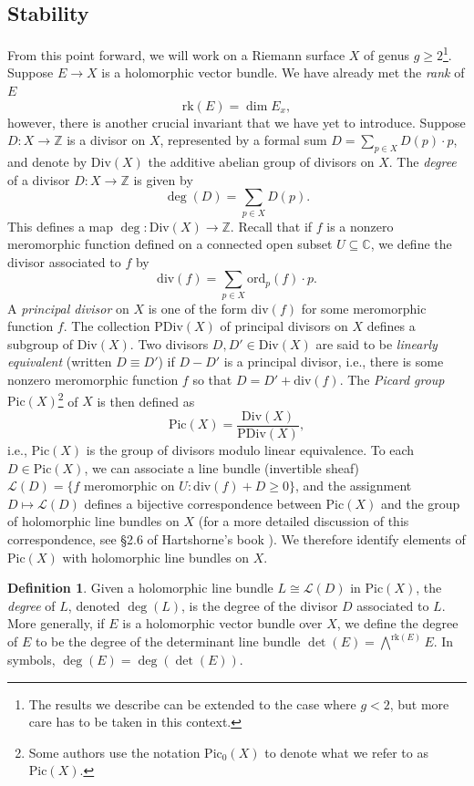 \documentclass[10pt]{amsart}
\numberwithin{equation}{section}
\def\~#1{\mathscr{#1}}
\newcommand{\C}{\mathbb{C}}
\newcommand{\Z}{\mathbb{Z}}
\newcommand{\ord}{\mathrm{ord}}
\newcommand{\rk}{\mathrm{rk}}
\renewcommand{\div}{\mathrm{div}}
\newcommand{\Div}{\mathrm{Div}}
\newcommand{\PDiv}{\mathrm{PDiv}}
\newcommand{\Pic}{\mathrm{Pic}}
\theoremstyle{plain}
\theoremstyle{definition}
\newtheorem{defn}[thm]{Definition}
\theoremstyle{remark}
\begin{document}
\subsection{Stability}
From this point forward, we will work on a Riemann surface $X$ of genus $g \ge 2$\footnote{The results we describe can be extended to the case where $g < 2$, but more care has to be taken in this context.}. Suppose $E \to X$ is a holomorphic vector bundle. We have already met the \emph{rank} of $E$ 
\[\rk(E) = \dim E_x,\]
however, there is another crucial invariant that we have yet to introduce. Suppose $D: X \to \Z$ is a divisor on $X$, represented by a formal sum $D = \sum_{p \in X} D(p) \cdot p$, and denote by $\Div(X)$ the additive abelian group of divisors on $X$. The \emph{degree} of a divisor $D: X \to \Z$ is given by 
\[\deg(D) = \sum_{p \in X} D(p).\]
This defines a map $\deg: \Div(X) \to \Z$. Recall that if $f$ is a nonzero meromorphic function defined on a connected open subset $U \subseteq \C$, we define the divisor associated to $f$ by
\[\div(f) = \sum_{p \in X} \ord_p(f) \cdot p.\]
A \emph{principal divisor} on $X$ is one of the form $\div(f)$ for some meromorphic function $f$. The collection $\PDiv(X)$ of principal divisors on $X$ defines a subgroup of $\Div(X)$. Two divisors $D, D' \in \Div(X)$ are said to be \emph{linearly equivalent} (written $D \equiv D'$) if $D - D'$ is a principal divisor, i.e., there is some nonzero meromorphic function $f$ so that $D = D' + \div(f)$. The \emph{Picard group} $\Pic(X)$\footnote{Some authors use the notation $\Pic_0(X)$ to denote what we refer to as $\Pic(X)$.} of $X$ is then defined as
\[\Pic(X) = \frac{\Div(X)}{\PDiv(X)},\]
i.e., $\Pic(X)$ is the group of divisors modulo linear equivalence. To each $D \in \Pic(X)$, we can associate a line bundle (invertible sheaf) $\~L(D) = \{f \text{ meromorphic on } U : \div(f) + D \ge 0\}$, and the assignment $D \mapsto \~L(D)$ defines a bijective correspondence between $\Pic(X)$ and the group of holomorphic line bundles on $X$ (for a more detailed discussion of this correspondence, see \S 2.6 of Hartshorne's book \cite{hartshorne}). We therefore identify elements of $\Pic(X)$ with holomorphic line bundles on $X$. 

\begin{defn}
    Given a holomorphic line bundle $L \cong \~L(D)$ in $\Pic(X)$, the \emph{degree} of $L$, denoted $\deg(L)$, is the degree of the divisor $D$ associated to $L$. More generally, if $E$ is a holomorphic vector bundle over $X$, we define the degree of $E$ to be the degree of the determinant line bundle $\det(E) = \bigwedge^{\rk(E)}E$. In symbols, $\deg(E)= \deg(\det(E))$.
\end{defn}
\end{document}
